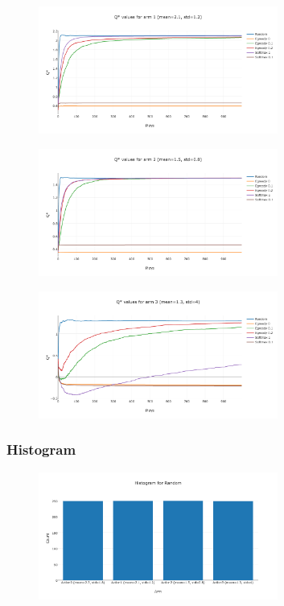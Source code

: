 \documentclass[11pt]{article}
\begin{document}
\begin{figure}[H]
   \centering
   \includegraphics[width=0.7\textwidth]{img/1-2/q2.png}
\end{figure}

\begin{figure}[H]
   \centering
   \includegraphics[width=0.7\textwidth]{img/1-2/q3.png}
\end{figure}


\begin{figure}[H]
   \centering
   \includegraphics[width=0.7\textwidth]{img/1-2/q4.png}
\end{figure}


\subsubsection{Histogram}

\begin{figure}[H]
   \centering
   \includegraphics[width=0.7\textwidth]{img/1-2/h1.png}
\end{figure}
\end{document}
